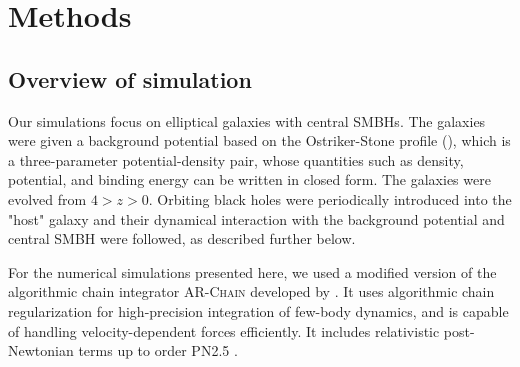 \documentclass[english, apj]{emulateapj}
\begin{document}
\section{Methods}\label{sec:methods}

\subsection{Overview of simulation}
Our simulations focus on elliptical galaxies with central SMBHs. The galaxies were given a background potential based on the Ostriker-Stone profile (\citet{2015ApJ...806L..28S}), which is a three-parameter potential-density pair, whose quantities such as density, potential, and binding energy can be written in closed form.  The galaxies were evolved from $4 > z > 0$.  Orbiting black holes were periodically introduced into the "host" galaxy and their dynamical interaction with the background potential and central SMBH were followed, as described further below.

For the numerical simulations presented here, we used a modified version of the algorithmic chain integrator \textsc{AR-Chain} developed by \citet{2006MNRAS.372..219M}. It uses algorithmic chain regularization for high-precision integration of few-body dynamics, and is capable of handling velocity-dependent forces efficiently. It includes relativistic post-Newtonian terms up to order PN2.5 \citep{2008AJ....135.2398M}.
\end{document}
